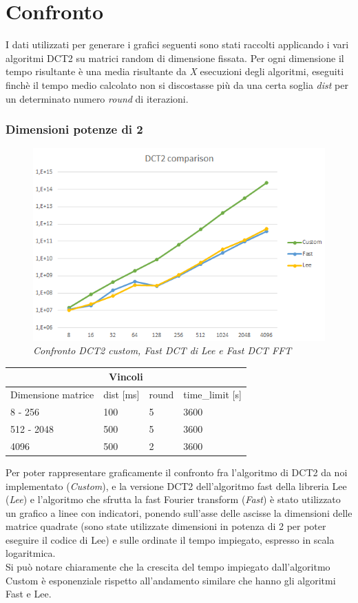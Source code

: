 \documentclass[a4paper,12pt]{report}
\begin{document}
\section{Confronto}
I dati utilizzati per generare i grafici seguenti sono stati raccolti applicando i vari algoritmi DCT2 su matrici random di dimensione fissata. Per ogni dimensione il tempo risultante è una media risultante da \textit{X} esecuzioni degli algoritmi, eseguiti finchè il tempo medio calcolato non si discostasse più da una certa soglia \textit{dist} per un determinato numero \textit{round} di iterazioni.

\subsubsection*{Dimensioni potenze di 2}
\begin{figure}[H]
\centering
\includegraphics[width=0.77\linewidth]{../img/comparison.png}
\caption{\textit{Confronto DCT2 custom, Fast DCT di Lee e Fast DCT FFT}}
\end{figure}
\begin{center}
	\begin{tabular}{ |p{4cm}||p{2cm}|p{2cm}|p{2.5cm}|  }
		\hline
		\multicolumn{4}{|c|}{Vincoli} \\
		\hline
		Dimensione matrice& dist [ms] & round & time\_limit [s]\\
		\hline
		8 - 256   & 100    &5&   3600\\
		512 - 2048&   500  & 5   &3600\\
		4096 &500 & 2&  3600\\
		\hline
	\end{tabular}
\end{center}
\hfill \break
\hfill \break
Per poter rappresentare graficamente il confronto fra l'algoritmo di DCT2 da noi implementato (\textit{Custom}), e la versione DCT2 dell'algoritmo fast della libreria Lee (\textit{Lee}) e l'algoritmo che sfrutta la fast Fourier transform (\textit{Fast}) è stato utilizzato un grafico a linee con indicatori, ponendo sull'asse delle ascisse la dimensioni delle matrice quadrate (sono state utilizzate dimensioni in potenza di 2 per poter eseguire il codice di Lee) e sulle ordinate il tempo impiegato, espresso in scala logaritmica. \\
Si può notare chiaramente che la crescita del tempo impiegato dall'algoritmo Custom è esponenziale rispetto all'andamento similare che hanno gli algoritmi Fast e Lee. 
\end{document}
